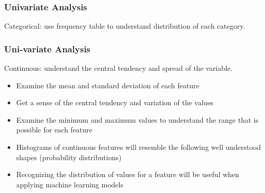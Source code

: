 \begin{frame}[fragile]\frametitle{Univariate Analysis}	
Categorical:   use frequency table to understand distribution of each category.
\end{frame}

\begin{frame}[fragile]\frametitle{Uni-variate Analysis}	
Continuous:  understand the central tendency  and  spread  of  the  variable. 
	\begin{itemize}
	\item Examine the mean and standard deviation of each feature
	\item Get a sense of the central tendency and variation of the values
	\item Examine the minimum and maximum values to understand the range that is possible for each feature
	\item Histograms of continuous features will resemble the following well understood shapes (probability distributions)
	\item Recognizing the distribution of values for a feature will be useful when applying machine learning models
	\end{itemize}	
\end{frame}



